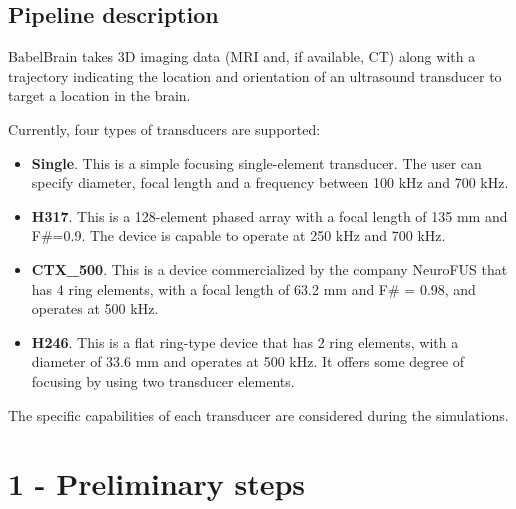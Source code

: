 \hypertarget{pipeline-description}{%
\subsection{Pipeline description}\label{pipeline-description}}

BabelBrain takes 3D imaging data (MRI and, if available, CT) along with
a trajectory indicating the location and orientation of an ultrasound
transducer to target a location in the brain.

Currently, four types of transducers are supported:

\begin{itemize}
\tightlist
\item
  \textbf{Single}. This is a simple focusing single-element transducer.
  The user can specify diameter, focal length and a frequency between
  100 kHz and 700 kHz.
\item
  \textbf{H317}. This is a 128-element phased array with a focal length
  of 135 mm and F\#=0.9. The device is capable to operate at 250 kHz and
  700 kHz.
\item
  \textbf{CTX\_500}. This is a device commercialized by the company
  NeuroFUS that has 4 ring elements, with a focal length of 63.2 mm and
  F\# = 0.98, and operates at 500 kHz.
\item
  \textbf{H246}. This is a flat ring-type device that has 2 ring
  elements, with a diameter of 33.6 mm and operates at 500 kHz. It
  offers some degree of focusing by using two transducer elements.
\end{itemize}

The specific capabilities of each transducer are considered during the
simulations.

\hypertarget{preliminary-steps}{%
\section{1 - Preliminary steps}\label{preliminary-steps}}

